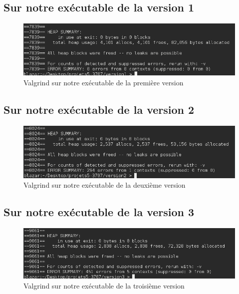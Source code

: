 \documentclass[10pt,a4paper]{article}
\begin{document}
\subsection{Sur notre exécutable de la version 1}
\begin{figure}[!h]
\centering
\includegraphics[width=\textwidth]{valgrind_version1.png}
\caption{\label{fig:v_base}Valgrind sur notre exécutable de la première version}
\end{figure}

\subsection{Sur notre exécutable de la version 2}
\begin{figure}[!h]
\centering
\includegraphics[width=\textwidth]{valgrind_version2.png}
\caption{\label{fig:v_base}Valgrind sur notre exécutable de la deuxième version}
\end{figure}

\subsection{Sur notre exécutable de la version 3}
\begin{figure}[!h]
\centering
\includegraphics[width=\textwidth]{valgrind_version3.png}
\caption{\label{fig:v_base}Valgrind sur notre exécutable de la troisième version}
\end{figure}
\end{document}
